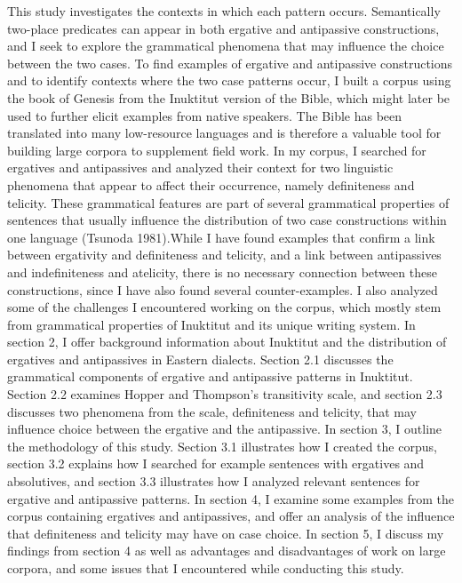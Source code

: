 \documentclass[12pt]{article}
\begin{document}
            This study investigates the contexts in which each pattern occurs. Semantically two-place predicates can appear in both ergative and antipassive constructions, and I seek to explore the grammatical phenomena that may influence the choice between the two cases. To find examples of ergative and antipassive constructions and to identify contexts where the two case patterns occur, I built a corpus using the book of Genesis from the Inuktitut version of the Bible, which might later be used to further elicit examples from native speakers. The Bible has been translated into many low-resource languages and is therefore a valuable tool for building large corpora to supplement field work. 
In my corpus, I searched for ergatives and antipassives and analyzed their context for two linguistic phenomena that appear to affect their occurrence, namely definiteness and telicity. These grammatical features are part of several grammatical properties of sentences that usually influence the distribution of two case constructions within one language (Tsunoda 1981).While I have found examples that confirm a link between ergativity and definiteness and telicity, and a link between antipassives and indefiniteness and atelicity, there is no necessary connection between these constructions, since I have also found several counter-examples. I also analyzed some of the challenges I encountered working on the corpus, which mostly stem from grammatical properties of Inuktitut and its unique writing system.
In section 2, I offer background information about Inuktitut and the distribution of ergatives and antipassives in Eastern dialects. Section 2.1 discusses the grammatical components of ergative and antipassive patterns in Inuktitut. Section 2.2 examines Hopper and Thompson’s transitivity scale, and section 2.3 discusses two phenomena from the scale, definiteness and telicity, that may influence choice between the ergative and the antipassive. In section 3, I outline the methodology of this study. Section 3.1 illustrates how I created the corpus, section 3.2 explains how I searched for example sentences with ergatives and absolutives, and section 3.3 illustrates how I analyzed relevant sentences for ergative and antipassive patterns. In section 4, I examine some examples from the corpus containing ergatives and antipassives, and offer an analysis of the influence that definiteness and telicity may have on case choice.  In section 5, I discuss my findings from section 4 as well as advantages and disadvantages of work on large corpora, and some issues that I encountered while conducting this study.
\end{document}
